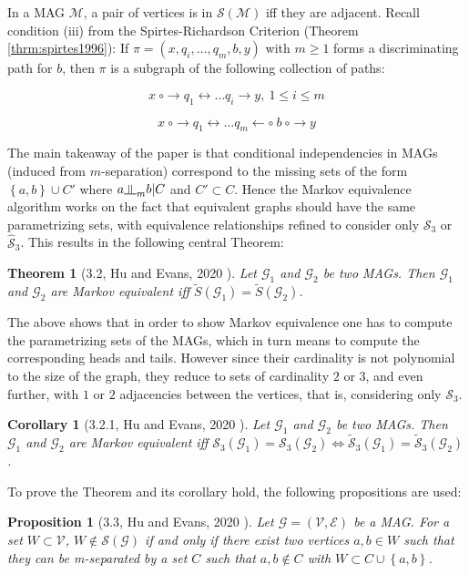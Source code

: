 \documentclass[a4paper]{article}
\newtheorem{theorem}{Theorem}
\newtheorem{proposition}{Proposition}
\newtheorem{corollary}{Corollary}
\newcommand{\indep}{\rotatebox[origin=c]{90}{$\models$}}
\begin{document}
In a MAG $\mathcal{M}$, a pair of vertices is in $\mathcal{S(M)}$ iff they are adjacent. Recall condition (iii) from the Spirtes-Richardson Criterion (Theorem \ref{thrm:spirtes1996}): If $\pi = (x,q_i,\ldots,q_m,b,y)$ with $m \geq 1$ forms a discriminating path for $b$, then $\pi$ is a subgraph of the following collection of paths: 

$$x ~\circ \rightarrow q_1 \leftrightarrow \ldots q_i \rightarrow y, ~1 \leq i \leq m$$

$$x ~\circ \rightarrow q_1 \leftrightarrow \ldots q_m \leftarrow \circ ~b ~\circ \rightarrow y$$

The main takeaway of the paper is that conditional independencies in MAGs (induced from $m$-separation) correspond to the missing sets of the form $\left\{ a, b \right\} \cup C'$ where $a \indep_m b | C$ and $C' \subset C$. Hence the Markov equivalence algorithm works on the fact that equivalent graphs should have the same parametrizing sets, with equivalence relationships refined to consider only $\mathcal{S}_3$ or $\mathcal{\hat{S}}_3$. This results in the following central Theorem:

\begin{theorem}[3.2, Hu and Evans, 2020 \cite{hu2020}]\label{thm:hu}Let $\mathcal{G}_1$ and $\mathcal{G}_2$ be two MAGs. Then $\mathcal{G}_1$ and $\mathcal{G}_2$ are Markov equivalent iff $\tilde{S}(\mathcal{G}_1) = \tilde{S}(\mathcal{G}_2)$.
\end{theorem}

The above shows that in order to show Markov equivalence one has to compute the parametrizing sets of the MAGs, which in turn means to compute the corresponding heads and tails. However since their cardinality is not polynomial to the size of the graph, they reduce to sets of cardinality $2$ or $3$, and even further, with $1$ or $2$ adjacencies between the vertices, that is, considering only $\mathcal{S}_3$.

\begin{corollary}[3.2.1, Hu and Evans, 2020 \cite{hu2020}]Let $\mathcal{G}_1$ and $\mathcal{G}_2$ be two MAGs. Then $\mathcal{G}_1$ and $\mathcal{G}_2$ are Markov equivalent iff $\mathcal{S}_3(\mathcal{G}_1) = \mathcal{S}_3(\mathcal{G}_2) \Leftrightarrow \mathcal{\tilde{S}}_3(\mathcal{G}_1) = \mathcal{\tilde{S}}_3(\mathcal{G}_2)$.
\end{corollary}

To prove the Theorem and its corollary hold, the following propositions are used:

\begin{proposition}[3.3, Hu and Evans, 2020 \cite{hu2020}] Let $\mathcal{G} = (\mathcal{V},\mathcal{E})$ be a MAG. For a set $W \subset \mathcal{V}$, $W \not \in \mathcal{S}(\mathcal{G})$ if and only if there exist two vertices $a,b \in W$ such that they can be m-separated by a set $C$ such that $a,b \not \in C$ with $W \subset C \cup \left\{ a,b\right\}$.
\end{proposition}
\end{document}
